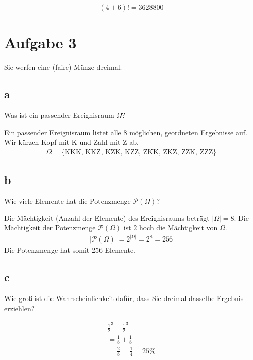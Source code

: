 \begin{align*}
    (4 + 6)! = 3628800
\end{align*}

\section{Aufgabe 3}
Sie werfen eine (faire) Münze dreimal.

\subsection{a}
Was ist ein passender Ereignisraum $\Omega$?

Ein passender Ereignisraum listet alle 8 möglichen, geordneten Ergebnisse auf.
Wir kürzen Kopf mit K und Zahl mit Z ab.
\begin{align*}
    \Omega = \{
    \text{KKK, }
    \text{KKZ, }
    \text{KZK, }
    \text{KZZ, }
    \text{ZKK, }
    \text{ZKZ, }
    \text{ZZK, }
    \text{ZZZ}
    \}
\end{align*}

\subsection{b}
Wie viele Elemente hat die Potenzmenge $\mathcal{P}(\Omega)$?

Die Mächtigkeit (Anzahl der Elemente) des Ereignisraums beträgt $|\Omega| = 8$.
Die Mächtigkeit der Potenzmenge $\mathcal{P}(\Omega)$ ist $2$ hoch die
Mächtigkeit von $\Omega$.
\begin{align*}
    |\mathcal{P}(\Omega)| = 2^{|\Omega|} = 2^8 = 256
\end{align*}
Die Potenzmenge hat somit 256 Elemente.

\subsection{c}
Wie groß ist die Wahrscheinlichkeit dafür, dass Sie dreimal dasselbe Ergebnis
erziehlen?

\begin{align*}
    \frac{1}{2}^3 + \frac{1}{2}^3 \\
    = \frac{1}{8} + \frac{1}{8}   \\
    = \frac{2}{8} = \frac{1}{4} = 25\%
\end{align*}